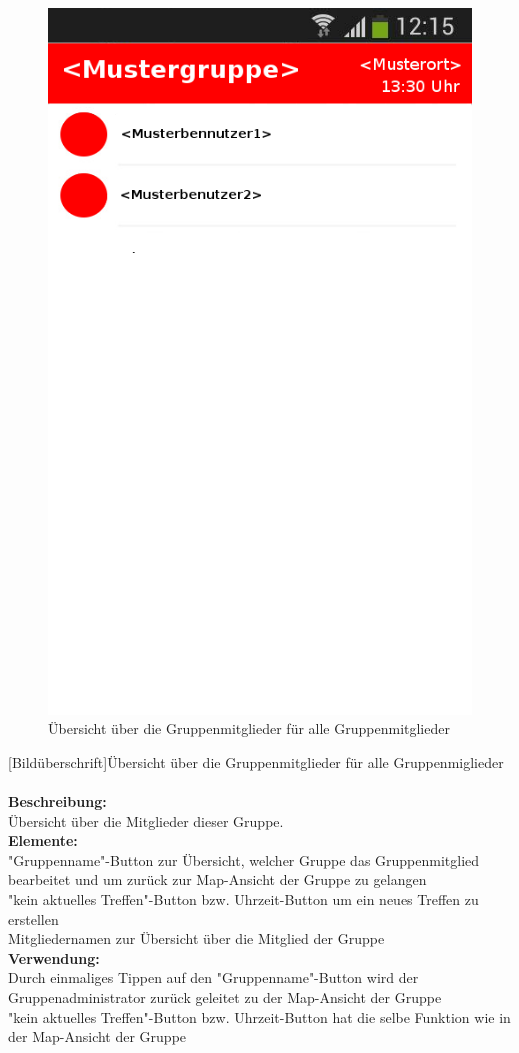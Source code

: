 \begin{figure}[H]
	\caption{Übersicht über die Gruppenmitglieder für alle Gruppenmitglieder}
	\includegraphics[scale =0.5]{resources/images/gruppendetails.png}
\end{figure}
[Bildüberschrift]Übersicht über die Gruppenmitglieder für alle Gruppenmiglieder\\ \\
\textbf{Beschreibung:}\\
Übersicht über die Mitglieder dieser Gruppe.\\
\textbf{Elemente:}\\
"Gruppenname"-Button zur Übersicht, welcher Gruppe das Gruppenmitglied  bearbeitet und um zurück zur Map-Ansicht der Gruppe zu gelangen\\
"kein aktuelles Treffen"-Button bzw. Uhrzeit-Button um ein neues Treffen zu erstellen\\
Mitgliedernamen zur Übersicht über die Mitglied der Gruppe\\
\textbf{Verwendung:}\\
Durch einmaliges Tippen auf den "Gruppenname"-Button wird der Gruppenadministrator zurück geleitet zu der Map-Ansicht der Gruppe\\
"kein aktuelles Treffen"-Button bzw. Uhrzeit-Button hat die selbe Funktion wie in der Map-Ansicht der Gruppe\\

